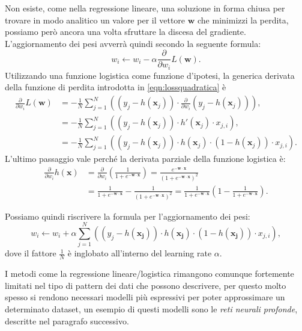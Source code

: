 \documentclass[../../main.tex]{subfiles}
\begin{document}
    Non esiste, come nella regressione lineare, una soluzione in forma chiusa per trovare in modo analitico un valore per il vettore $\boldsymbol{w}$ che minimizzi la perdita, possiamo però ancora una volta sfruttare la discesa del gradiente. L'aggiornamento dei pesi avverrà quindi secondo la seguente formula:
    \[w_i \leftarrow w_i - \alpha \frac{\partial}{\partial w_i} L(\boldsymbol{w}).\]
    Utilizzando una funzione logistica come funzione d'ipotesi, la generica derivata della funzione di perdita introdotta in \eqref{eqn:lossquadratica} è
    \begin{align*}
        \frac{\partial}{\partial w_i} L(\boldsymbol{w}) &= -\frac{1}{N} \sum_{j=1}^N \left((y_j - h(\boldsymbol{x}_j)) \cdot \frac{\partial}{\partial w_i} (y_j - h(\boldsymbol{x}_j)) \right),\\
        &= -\frac{1}{N} \sum_{j=1}^N \left((y_j - h(\boldsymbol{x}_j)) \cdot h'(\boldsymbol{x}_j) \cdot x_{j,i} \right),\\
        &= -\frac{1}{N} \sum_{j=1}^N \left((y_j - h(\boldsymbol{x}_j)) \cdot h(\boldsymbol{x}_j) \cdot (1 - h(\boldsymbol{x}_j)) \cdot x_{j,i} \right).
    \end{align*}
    L'ultimo passaggio vale perché la derivata parziale della funzione logistica è:
    \begin{align*}
        \frac{\partial}{\partial w_i} h(\boldsymbol{x}) &= \frac{\partial}{\partial w_i} \left(\frac{1}{1 + e^{-\boldsymbol{w}\cdot\boldsymbol{x}}}\right) = \frac{e^{-\boldsymbol{w}\cdot \boldsymbol{x}}}{\left(1 + e^{-\boldsymbol{w}\cdot \boldsymbol{x}}\right)^2}\\
        &= \frac{1}{1 + e^{-\boldsymbol{w}\cdot\boldsymbol{x}}} - \frac{1}{\left(1 + e^{-\boldsymbol{w}\cdot\boldsymbol{x}}\right)^2} = \frac{1}{1 + e^{-\boldsymbol{w}\cdot\boldsymbol{x}}}\left(1 - \frac{1}{1 + e^{-\boldsymbol{w}\cdot\boldsymbol{x}}}\right).
    \end{align*}

    Possiamo quindi riscrivere la formula per l'aggiornamento dei pesi:
    \begin{equation}
        w_i \leftarrow w_i + \alpha \sum_{j=1}^N \left((y_j - h(\boldsymbol{x_j})) \cdot h(\boldsymbol{x_j}) \cdot (1 - h(\boldsymbol{x_j})) \cdot x_{j,i} \right),
    \end{equation}
    dove il fattore $\frac{1}{N}$ è inglobato all'interno del learning rate $\alpha$.

    I metodi come la regressione lineare/logistica rimangono comunque fortemente limitati nel tipo di pattern dei dati che possono descrivere, per questo molto spesso si rendono necessari modelli più espressivi per  poter approssimare un determinato dataset, un esempio di questi modelli sono le \textit{reti neurali profonde}, descritte nel paragrafo successivo.
\end{document}
